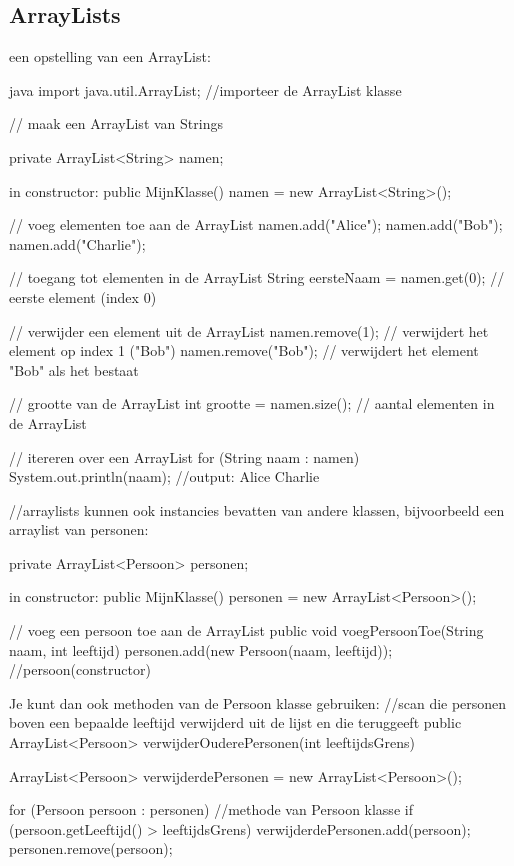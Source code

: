 \documentclass[a4paper,11pt]{article}
\begin{document}
\subsection{ArrayLists}
een opstelling van een ArrayList:

\begin{codeblock}[arraylist]{java}
    import java.util.ArrayList; //importeer de ArrayList klasse

    // maak een ArrayList van Strings

    private ArrayList<String> namen;

    in constructor:
        public MijnKlasse() {
            namen = new ArrayList<String>();
        }

    // voeg elementen toe aan de ArrayList
    namen.add("Alice");
    namen.add("Bob");
    namen.add("Charlie");

    // toegang tot elementen in de ArrayList
    String eersteNaam = namen.get(0); // eerste element (index 0)

    // verwijder een element uit de ArrayList
    namen.remove(1); // verwijdert het element op index 1 ("Bob")
    namen.remove("Bob"); // verwijdert het element "Bob" als het bestaat

    // grootte van de ArrayList
    int grootte = namen.size(); // aantal elementen in de ArrayList

    // itereren over een ArrayList
    for (String naam : namen) {
        System.out.println(naam);
        //output: Alice Charlie
    }

    //arraylists kunnen ook instancies bevatten van
    andere klassen,
    bijvoorbeeld een arraylist van personen:

    private ArrayList<Persoon> personen;

    in constructor:
        public MijnKlasse() {
            personen = new ArrayList<Persoon>();
        }

    // voeg een persoon toe aan de ArrayList
    public void voegPersoonToe(String naam, int leeftijd) 
    {
    personen.add(new Persoon(naam, leeftijd)); //persoon(constructor)
    }

    Je kunt dan ook methoden van de Persoon klasse gebruiken:
    //scan die personen boven een bepaalde leeftijd verwijderd 
    uit de lijst en die teruggeeft
    public ArrayList<Persoon> verwijderOuderePersonen(int leeftijdsGrens) 
    {
        ArrayList<Persoon> verwijderdePersonen = new ArrayList<Persoon>();

        for (Persoon persoon : personen) 
        {
            //methode van Persoon klasse
            if (persoon.getLeeftijd() > leeftijdsGrens) 
            {
                verwijderdePersonen.add(persoon);
                personen.remove(persoon);
            }
        }
    }
\end{codeblock}
\end{document}
